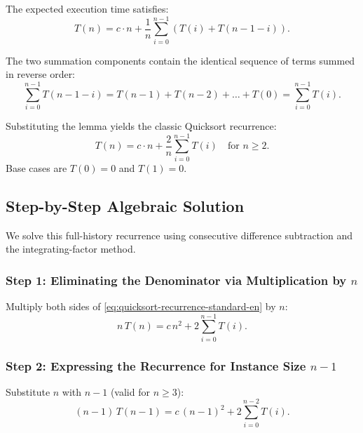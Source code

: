 The expected execution time satisfies:
\begin{equation}
  T(n) = c \cdot n + \frac{1}{n} \sum_{i=0}^{n-1} \left( T(i) + T(n - 1 - i) \right).
  \label{eq:quicksort-expected-raw-en}
\end{equation}

\begin{lemma}
The two summation components contain the identical sequence of terms summed in reverse order:
\begin{equation}
  \sum_{i=0}^{n-1} T(n - 1 - i) = T(n-1) + T(n-2) + \dots + T(0) = \sum_{i=0}^{n-1} T(i).
\end{equation}
\end{lemma}

Substituting the lemma yields the classic Quicksort recurrence:
\begin{equation}
  T(n) = c \cdot n + \frac{2}{n} \sum_{i=0}^{n-1} T(i) \quad \text{for } n \ge 2.
  \label{eq:quicksort-recurrence-standard-en}
\end{equation}
Base cases are $T(0) = 0$ and $T(1) = 0$.

\subsection{Step-by-Step Algebraic Solution}
\label{subsec:quicksort-step-by-step-solution}

We solve this full-history recurrence using consecutive difference subtraction and the integrating-factor method.

\subsubsection{Step 1: Eliminating the Denominator via Multiplication by $n$}
Multiply both sides of \autoref{eq:quicksort-recurrence-standard-en} by $n$:
\begin{equation}
  n \, T(n) = c \, n^2 + 2 \sum_{i=0}^{n-1} T(i).
  \label{eq:quicksort-step1-en}
\end{equation}

\subsubsection{Step 2: Expressing the Recurrence for Instance Size $n - 1$}
Substitute $n$ with $n - 1$ (valid for $n \ge 3$):
\begin{equation}
  (n - 1) \, T(n - 1) = c \, (n - 1)^2 + 2 \sum_{i=0}^{n - 2} T(i).
  \label{eq:quicksort-step2-en}
\end{equation}

